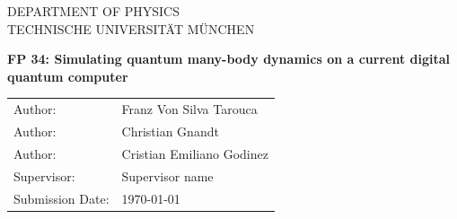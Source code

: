 
\newcommand{\getTitle}{FP 34: Simulating quantum many-body dynamics on a current digital quantum computer}
\newcommand{\getAuthor}{Franz Von Silva Tarouca}
\newcommand{\getAuthorI}{Christian Gnandt}
\newcommand{\getAuthorII}{Cristian Emiliano Godinez}

\newcommand{\getSupervisor}{Supervisor name}


\begin{titlepage}
    \centering


    \vspace{5mm}
    {\huge\MakeUppercase{Department of Physics}}\\

    \vspace{5mm}
    {\large\MakeUppercase{Technische Universität München}}\\

    \vspace{20mm}

    \vspace{15mm}
    {\huge\bfseries \getTitle{}}

    \vspace{20mm}
    \begin{tabular}{l l}
        Author:          & \getAuthor{} \\
        Author:          & \getAuthorI{} \\
        Author:          & \getAuthorII{} \\
        Supervisor:      & \getSupervisor{} \\
        Submission Date: & \today{} \\
    \end{tabular}

\end{titlepage}